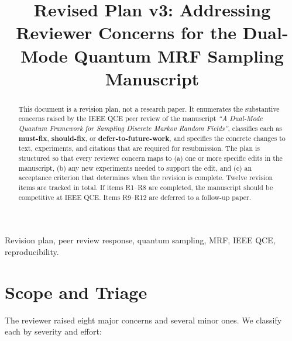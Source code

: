 \documentclass[conference,10pt]{IEEEtran}
\begin{document}
\title{Revised Plan v3: Addressing Reviewer Concerns for the Dual-Mode
Quantum MRF Sampling Manuscript}

\author{
}

\maketitle

\begin{abstract}
This document is a revision plan, not a research paper. It enumerates the
substantive concerns raised by the IEEE QCE peer review of the manuscript
\emph{``A Dual-Mode Quantum Framework for Sampling Discrete Markov Random
Fields''}, classifies each as \textbf{must-fix}, \textbf{should-fix}, or
\textbf{defer-to-future-work}, and specifies the concrete changes to text,
experiments, and citations that are required for resubmission. The plan is
structured so that every reviewer concern maps to (a) one or more specific
edits in the manuscript, (b) any new experiments needed to support the edit,
and (c) an acceptance criterion that determines when the revision is
complete. Twelve revision items are tracked in total. If items
R1--R8 are completed, the manuscript should be competitive at IEEE QCE.
Items R9--R12 are deferred to a follow-up paper.
\end{abstract}

\begin{IEEEkeywords}
Revision plan, peer review response, quantum sampling, MRF, IEEE QCE,
reproducibility.
\end{IEEEkeywords}

\section{Scope and Triage}

The reviewer raised eight major concerns and several minor ones. We classify
each by severity and effort:
\end{document}
